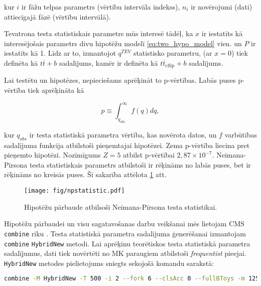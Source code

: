 kur $i$ ir fāžu telpas parametrs (vērtību intervāla indekss), $n_{i}$ ir novērojumi (dati) attiecīgajā fāzē (vērtību intervālā).

Tevatrona testa statistiskais parametrs mūs interesē tādēļ, ka $x$ ir iestatīts kā interesējošais parametrs divu hipotēžu modelī \ref{eq:two_hypo_model} vien. un $P$ ir iestatīts kā 1. Līdz ar to, izmantojot $q^{TEV}$ statistisko parametru, \Hnull (ar $x=0$) tiek definēta kā $t\overline{t} + b$ sadalījums, kamēr \Halt ir definēta kā $t\overline{t}_{\text{cflip}} + b$ sadalījums.

Lai testētu \Hnull un \Halt hipotēzes, nepieciešams aprēķināt to p-vērtības. Labās puses p-vērtība tiek aprēķināta kā

\begin{equation}
p\equiv\int_{q_{obs}}^{\infty}f(q)dq,
\end{equation}
    
kur $q_{obs}$ ir testa statistiskā parametra vērtība, kas novērota datos, un $f$ varbūtības sadalījuma funkcija atbilstoši pieņemtajai hipotēzei. Zema p-vērtība liecina pret pieņemto hipotēzi. Nozīmīgums $Z=5$ atbilst p-vērtībai $2,87\times10^{-7}$. Neimana-Pīrsona testa statistiskais parametrs atbilstoši \Hnull ir rēķināms no labās puses, bet \Halt ir rēķināms no kreisās puses. Šī sakarība attēlota \ref{fig:npstatistic} att.

\begin{figure}
  \centering
  \texttt{[image: fig/npstatistic.pdf]}
  \caption{Hipotēžu pārbaude atbilsoši Neimana-Pīrsona testa statistikai.}
  \label{fig:npstatistic}
\end{figure}

Hipotēžu pārbaudei un visu sagatavošanas darbu veikšanai mēs lietojam CMS \lstinline[language=sh]|combine| rīku \cite{url:combine}.
Testa statistiskā parametra sadalījuma ģenerēšanai izmantojam  \lstinline[language=sh]|combine| \lstinline[language=sh]|HybridNew| metodi. Lai aprēķinu teorētiskos testa statistiskā parametra sadalījumus, dati tiek novērtēti no MK paraugiem atbilstoši \textit{frequentist} pieejai. \lstinline[language=sh]|HybridNew| metodes pielietojums sniegts sekojošā komandu sarakstā:

\begin{lstlisting}[language=sh, breaklines=true]
  combine -M HybridNew -T 500 -i 2 --fork 6 --clsAcc 0 --fullBToys -m 125.7 TwoHypo.root --seed 8192 --testStat=TEV  --saveHybridResult --singlePoint 1
\end{lstlisting}

